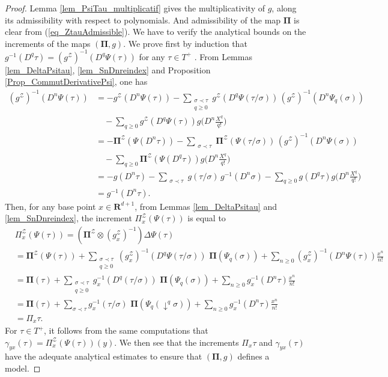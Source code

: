 \documentclass[11pt]{preprint}
\newcommand{\mcZ}{\mathcal{Z}}
\def\PPi{\boldsymbol{\Pi}}
\def\eqref#1{(\ref{#1})}
\newcommand{\bfR}{\mathbf{R}}
\begin{document}
\begin{proof}
 Lemma \ref{lem_PsiTau_multiplicatif} gives the multiplicativity of $g$, along its admissibility with respect to polynomials. And admissibility of the map $\PPi$ is clear from \eqref{eq_ZtauAdmissible}.
 We have to verify the analytical bounds on the increments of the maps $(\PPi,g)$. We prove first by induction that $g^{-1}(D^q\tau) = (g^\mcZ)^{-1}(D^q\Psi(\tau))$  for any $\tau\in T^+$ . From Lemmas \ref{lem_DeltaPsitau}, \ref{lem_SnDnreindex} and Proposition \ref{Prop_CommutDerivativePsi}, one has   
	\begin{align*}
	(g^\mcZ)^{-1}(D^n\Psi(\tau) ) &=	 -g^\mcZ(D^n\Psi(\tau) ) - \sum_{\substack{\sigma\prec\tau\\ q\geq 0}} g^\mcZ(D^q\Psi(\tau/\sigma)) \, (g^\mcZ)^{-1}(D^n\Psi_q(\sigma))
	\\ & 	\quad-\sum_{q\geq 0} g^\mcZ(D^q\Psi(\tau)) g\Big(D^n\frac{X^q}{q!}\Big)
		\\
		&= -\PPi^\mcZ(\Psi(D^n\tau) ) - \sum_{\substack{\sigma\prec\tau}} \PPi^\mcZ(\Psi(\tau/\sigma)) \, (g^\mcZ)^{-1}(D^n\Psi(\sigma))
	\\ & 	\quad-\sum_{q\geq 0} \PPi^\mcZ(\Psi(D^q\tau)) g\Big(D^n\frac{X^q}{q!}\Big)
		\\
		&= -g(D^n\tau ) - \sum_{\substack{\sigma\prec\tau}} g(\tau/\sigma) \, g^{-1}(D^n\sigma)
		-\sum_{q\geq 0} g(D^q\tau) g\Big(D^n\frac{X^q}{q!}\Big)
		\\
		&= 	g^{-1}(D^n\tau).
	\end{align*}
	Then, for any base point $x\in\bfR^{d+1}$, from Lemmas \ref{lem_DeltaPsitau} and \ref{lem_SnDnreindex}, the increment $\Pi_x^\mcZ( \Psi(\tau)   )$ is equal to
	\begin{align*}
		&\Pi_x^\mcZ( \Psi(\tau)   ) =  (\PPi^\mcZ\otimes (g^\mcZ_x)^{-1})\Delta \Psi(\tau)
		\\
		&=\PPi^\mcZ(\Psi(\tau)) + \sum_{\substack{\sigma\prec\tau \\ q\geq0}} (g^\mcZ_x)^{-1}(D^q\Psi(\tau/\sigma))  \,\, \PPi( \Psi_q(\sigma) ) +\sum_{n\geq0} (g_x^\mcZ)^{-1} (D^n\Psi(\tau)) \frac{x^n}{n!}
		\\
		&= \PPi(\tau) +  \sum_{\substack{\sigma\prec\tau \\ q\geq0}} g_x^{-1}(D^q(\tau/\sigma))  \,\, \PPi( \Psi_q(\sigma) ) + \sum_{n\geq0} g_x^{-1} (D^n\tau) \frac{x^n}{n!}
		\\
		&= \PPi(\tau) +  \sum_{\sigma\prec\tau} g_x^{-1}(\tau/\sigma)  \,\, \PPi( \Psi_q(\downarrow^q\sigma) ) +\sum_{n\geq0} g_x^{-1} (D^n\tau) \frac{x^n}{n!}
		\\
		&=\Pi_x\tau.
	\end{align*}
	For $\tau\in T^+$, it follows from the same computations that $\gamma_{yx}(\tau) = \Pi_x^\mcZ(\Psi(\tau))(y) $. We then see that the increments $\Pi_x\tau$ and $\gamma_{yx}(\tau)$ have the adequate analytical estimates to ensure that $(\PPi,g)$ defines a model. 
\end{proof}
\end{document}
